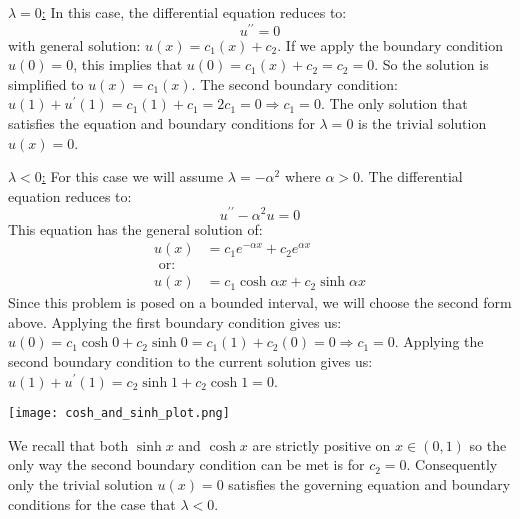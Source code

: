 \vspace{0.5cm}

\noindent \underline{$\lambda = 0$:}  In this case, the differential equation reduces to:
\begin{equation*}
u^{\prime \prime} = 0
\end{equation*}
with general solution: $u(x) = c_1(x) + c_2$.  If we apply the boundary condition $u(0) = 0$, this implies that $u(0) = c_1(x) + c_2 = c_2 = 0$. So the solution is simplified to $u(x) = c_1(x)$.  The second boundary condition: $u(1) + u^{\prime}(1) = c_1(1) + c_1 = 2c_1 = 0 \Rightarrow c_1 = 0$. The only solution that satisfies the equation and boundary conditions for $\lambda = 0$ is the trivial solution $u(x) = 0$.

\vspace{4.5cm}

\noindent\underline{$\lambda < 0$:}  For this case we will assume $\lambda = -\alpha^2$ where $\alpha > 0$.  The differential equation reduces to:
\begin{equation*}
u^{\prime \prime} - \alpha^2u = 0
\end{equation*}
This equation has the general solution of:
\begin{align*}
u(x) &= c_1e^{-\alpha x} + c_2e^{\alpha x} \\
\text{ or: } & \\
u(x) &=c_1 \cosh{\alpha x} + c_2 \sinh{\alpha x} 
\end{align*}
Since this problem is posed on a bounded interval, we will choose the second form above.  Applying the first boundary condition gives us: $u(0) = c_1\cosh{0} + c_2\sinh{0} = c_1(1) + c_2(0) = 0 \Rightarrow c_1 = 0$.  Applying the second boundary condition to the current solution gives us: $u(1) + u^{\prime}(1) = c_2\sinh{1} + c_2\cosh{1} = 0$. \begin{marginfigure} \texttt{[image: cosh\_and\_sinh\_plot.png]} \end{marginfigure}  
We recall that both $\sinh{x}$ and $\cosh{x}$ are strictly positive on $x\in(0,1)$ so the only way the second boundary condition can be met is for $c_2 = 0$.  Consequently only the trivial solution $u(x) = 0$ satisfies the governing equation and boundary conditions for the case that $\lambda < 0$.


